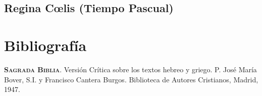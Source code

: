 \documentclass[10pt,twoside]{book}
\begin{document}
\section*{Regina C{\oe}lis (Tiempo Pascual)}
\vspace{0.2em}
\begin{paracol}{2}
      \begin{leftcolumn}
            
      \end{leftcolumn}
      \begin{otherlanguage}{latin}
            \begin{rightcolumn}
                  
            \end{rightcolumn}
      \end{otherlanguage}


      \begin{leftcolumn*}
            
      \end{leftcolumn*}
      \begin{otherlanguage}{latin}
            \begin{rightcolumn}
                  
            \end{rightcolumn}
      \end{otherlanguage}
\end{paracol}


\chapter*{Bibliografía}

\setlength{\parindent}{0ex}
\textsc{\textbf{Sagrada Biblia}}. Versión Crítica sobre los textos hebreo y griego. P. José María Bover, S.I. y Francisco Cantera Burgos. Biblioteca de Autores Cristianos, Madrid, 1947.
\end{document}
